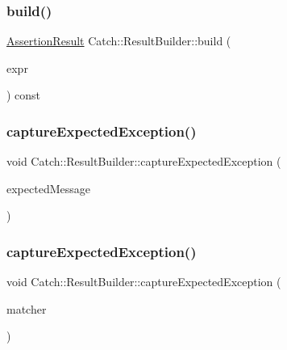 \mbox{\label{class_catch_1_1_result_builder_a475d19a04c5d10a5a87cbb85447b59da}} 
\subsubsection{\texorpdfstring{build()}{build()}\hspace{0.1cm}{\footnotesize\ttfamily [2/2]}}
{\footnotesize\ttfamily \mbox{\hyperlink{class_catch_1_1_assertion_result}{Assertion\+Result}} Catch\+::\+Result\+Builder\+::build (\begin{DoxyParamCaption}\item[{\mbox{\hyperlink{struct_catch_1_1_decomposed_expression}{Decomposed\+Expression}} const \&}]{expr }\end{DoxyParamCaption}) const}

\mbox{\label{class_catch_1_1_result_builder_a9ac96f6220c8dd8e4feee725c6228d77}} 
\subsubsection{\texorpdfstring{capture\+Expected\+Exception()}{captureExpectedException()}\hspace{0.1cm}{\footnotesize\ttfamily [1/2]}}
{\footnotesize\ttfamily void Catch\+::\+Result\+Builder\+::capture\+Expected\+Exception (\begin{DoxyParamCaption}\item[{std\+::string const \&}]{expected\+Message }\end{DoxyParamCaption})}

\mbox{\label{class_catch_1_1_result_builder_a2d6a194258f07f212fef098c0201038a}} 
\subsubsection{\texorpdfstring{capture\+Expected\+Exception()}{captureExpectedException()}\hspace{0.1cm}{\footnotesize\ttfamily [2/2]}}
{\footnotesize\ttfamily void Catch\+::\+Result\+Builder\+::capture\+Expected\+Exception (\begin{DoxyParamCaption}\item[{\mbox{\hyperlink{struct_catch_1_1_matchers_1_1_impl_1_1_matcher_base}{Matchers\+::\+Impl\+::\+Matcher\+Base}}$<$ std\+::string $>$ const \&}]{matcher }\end{DoxyParamCaption})}

